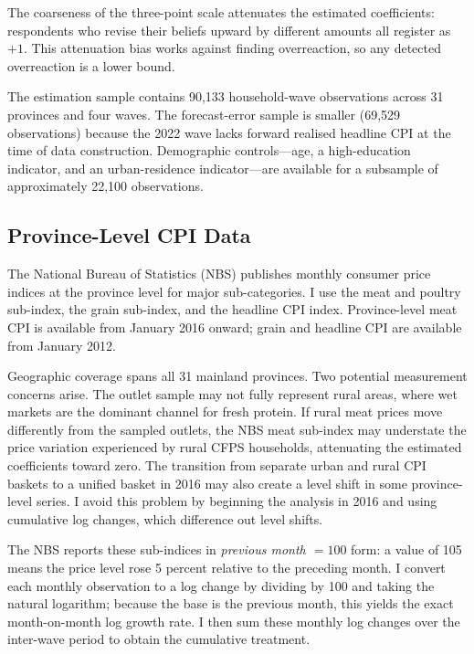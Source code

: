 The coarseness of the three-point scale attenuates the estimated
coefficients: respondents who revise their beliefs upward by
different amounts all register as $+1$.
This attenuation bias works against finding overreaction, so
any detected overreaction is a lower bound.

The estimation sample contains 90,133 household-wave
observations across 31 provinces and four waves.
The forecast-error sample is smaller (69,529 observations)
because the 2022 wave lacks forward realised headline CPI
at the time of data construction.
Demographic controls---age, a high-education indicator, and
an urban-residence indicator---are available for a subsample
of approximately 22,100 observations.

\subsection{Province-Level CPI Data}\label{sec:nbs_cpi}

The National Bureau of Statistics (NBS) publishes monthly
consumer price indices at the province level for major
sub-categories.
I use the meat and poultry sub-index, the grain sub-index,
and the headline CPI index.
Province-level meat CPI is available from January 2016 onward;
grain and headline CPI are available from January 2012.

Geographic coverage spans all 31 mainland provinces.
Two potential measurement concerns arise.
The outlet sample may not fully represent rural areas,
where wet markets are the dominant channel for fresh protein.
If rural meat prices move differently from the sampled outlets,
the NBS meat sub-index may understate the price variation
experienced by rural CFPS households, attenuating the
estimated coefficients toward zero.
The transition from separate urban and rural CPI
baskets to a unified basket in 2016 may also create a level shift
in some province-level series.
I avoid this problem by beginning the analysis in 2016 and
using cumulative log changes, which difference out level shifts.

The NBS reports these sub-indices in \emph{previous month
$= 100$} form: a value of 105 means the price level rose
5 percent relative to the preceding month.
I convert each monthly observation to a log change by
dividing by 100 and taking the natural logarithm; because the
base is the previous month, this yields the exact
month-on-month log growth rate.
I then sum these monthly log changes over the inter-wave
period to obtain the cumulative treatment.

